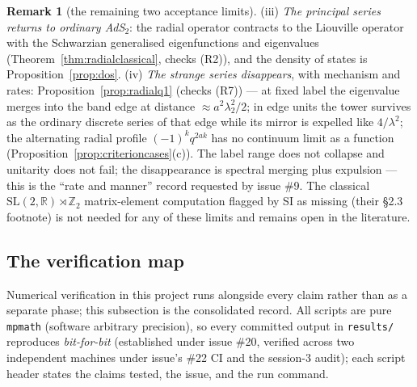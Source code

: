 \documentclass[11pt,a4paper]{article}
\theoremstyle{definition}
\newtheorem{remark}[definition]{Remark}
\theoremstyle{plain}
\newcommand{\Z}{\mathbb{Z}}
\newcommand{\R}{\mathbb{R}}
\begin{document}
\begin{remark}[the remaining two acceptance limits]\label{rem:otherlimits}
(iii) \emph{The principal series returns to ordinary AdS$_2$}: the radial operator
contracts to the Liouville operator with the Schwarzian generalised eigenfunctions and
eigenvalues (Theorem~\ref{thm:radialclassical}, checks (R2)), and the density of states is
Proposition~\ref{prop:dos}. (iv) \emph{The strange series disappears}, with mechanism and
rates: Proposition~\ref{prop:radialq1} (checks (R7)) --- at fixed label the eigenvalue
merges into the band edge at distance $\approx a^{2}\lambda_{2}^{2}/2$; in edge units the
tower survives as the ordinary discrete series of that edge while its mirror is expelled
like $4/\lambda^{2}$; the alternating radial profile $(-1)^{k}q^{2ak}$ has no continuum
limit as a function (Proposition~\ref{prop:criterioncases}(c)). The label range does not
collapse and unitarity does not fail; the disappearance is spectral merging plus expulsion
--- this is the ``rate and manner'' record requested by issue \#9. The classical
$\mathrm{SL}(2,\R)\rtimes\Z_2$ matrix-element computation flagged by SI as missing (their
\S2.3 footnote) is not needed for any of these limits and remains open in the literature.
\end{remark}

\subsection{The verification map}
\label{sec:verificationmap}


Numerical verification in this project runs alongside every claim rather than as a
separate phase; this subsection is the consolidated record. All scripts are pure
\texttt{mpmath} (software arbitrary precision), so every committed output in
\texttt{results/} reproduces \emph{bit-for-bit} (established under issue \#20, verified
across two independent machines under issue's \#22 CI and the session-3 audit); each
script header states the claims tested, the issue, and the run command.
\end{document}
